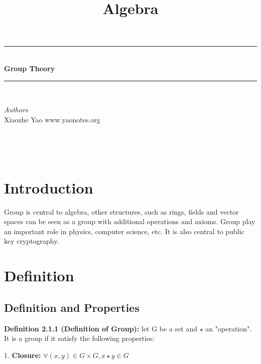 \documentclass[12pt,openany]{book}
\title{Algebra}
\theoremstyle{definition}
\theoremstyle{definition}
\newcommand{\HRule}{\rule{\linewidth}{0.5mm}} %
\begin{document}
 

\begin{center}
\HRule \\[0.4cm]
{ \huge \bfseries Group Theory}\\[0.4cm] %
\HRule \\[1.5cm]
\begin{minipage}{0.4\textwidth}
\begin{flushleft} \large
\emph{Authors}\\
Xiaozhe Yao \newline
www.yaonotes.org \newline
\end{flushleft}
\end{minipage}
~
\begin{minipage}{0.4\textwidth}
\begin{flushright} \large

\end{flushright}
\end{minipage}\\[0.5cm]
\end{center}

\chapter{Introduction}

Group is central to algebra, other structures, such as rings, fields and vector spaces can be seen as a group with additional operations and axioms. Group play an important role in physics, computer science, etc. It is also central to public key cryptography.

\chapter{Definition}

\section{Definition and Properties}

\noindent\textbf{Definition 2.1.1 (Definition of Group):} let G be a set and $\star$ an "operation". It is a group if it satisfy the following properties:

1. \textbf{Closure:} $\forall (x,y) \in G \times G, x \star y \in G $
\end{document}
